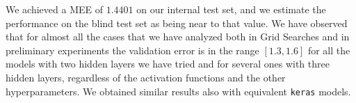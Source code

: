 We achieved a MEE of $1.4401$ on our internal test set, and we estimate the performance on the blind test set as being near to that value. We have observed that for almost all the cases that we have analyzed both in Grid Searches and in preliminary experiments the validation error is in the range $[1.3, 1.6]$ for all the models with two hidden layers we have tried and for several ones with three hidden layers, regardless of the activation functions and the other hyperparameters. We obtained similar results also with equivalent \texttt{keras} models.

